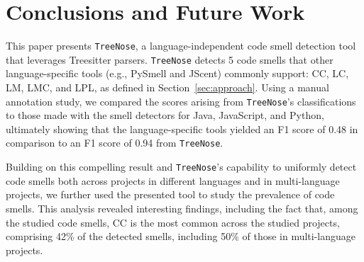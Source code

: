 \section{Conclusions and Future Work}






This paper presents \texttt{TreeNose}, a language-independent code smell
detection tool that leverages Treesitter parsers. \texttt{TreeNose} detects 5
code smells that other language-specific tools (e.g., PySmell and JScent)
commonly support: CC, LC, LM, LMC, and LPL, as defined in
Section~\ref{sec:approach}.
%
Using a manual annotation study, we compared the scores arising from
\texttt{TreeNose}'s classifications to those made with the smell detectors for
Java, JavaScript, and Python,
%
ultimately showing that the language-specific tools yielded an F1 score of 0.48
in comparison to an F1 score of 0.94 from \texttt{TreeNose}.

Building on this compelling result and \texttt{TreeNose}'s capability to
uniformly detect code smells both across projects in different languages
and in multi-language projects, we further used the presented tool to study the
prevalence of code smells.
%
This analysis revealed interesting findings, including the fact that, among the
studied code smells, CC is the most common across the studied projects,
comprising 42\% of the detected smells, including 50\% of those in
multi-language projects.

